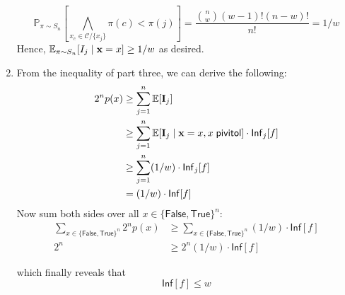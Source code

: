 \documentclass[12pt]{article}%
\newcommand{\Exp}[1]{\mathbb{E}_{#1}}
\begin{document}
\begin{enumerate}
  $$ \mathbb{P}_{\pi \sim S_n}\left[\bigwedge_{x_c \in \mathcal{C} / \{x_j\}} \pi(c) < \pi(j) \right] = \frac{ {n \choose w} (w-1)! (n-w)!}{n!} = 1/w $$
  Hence, $\Exp{\pi \sim S_n}[I_j \mid {\bf x} = x] \geq 1/w$ as desired.

  \item

  From the inequality of part three, we can derive the following:
  \begin{align*}
    2^n p(x) & \geq \sum_{j =1}^n \mathbb{E}[ {\bf I}_j] \\
             & \geq \sum_{j = 1}^n \mathbb{E}[ {\bf I}_j \mid {\bf x} = x, x \; \mathsf{pivitol}] \cdot \mathsf{Inf}_j[f] \\
             & \geq  \sum_{j = 1}^n (1/w) \cdot \mathsf{Inf}_j[f] \\
             & = (1/w) \cdot  \mathsf{Inf}[f]
  \end{align*}
  Now sum both sides over all $x \in \{\mathsf{False}, \mathsf{True}\}^n$:
  \begin{align*}
    \sum_{x \in \{\mathsf{False}, \mathsf{True}\}^n}2^n p(x) & \geq  \sum_{x \in \{\mathsf{False}, \mathsf{True}\}^n}(1/w)  \cdot  \mathsf{Inf}[f] \\
    2^n & \geq 2^n (1/w)\cdot \mathsf{Inf}[f]
  \end{align*}

  which finally reveals that
  $$ \mathsf{Inf}[f] \leq w $$

\end{enumerate}
\end{document}

